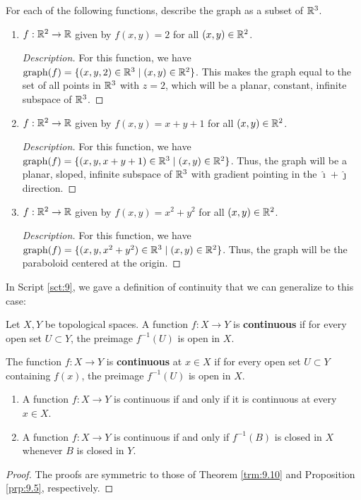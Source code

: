\documentclass[../main.tex]{subfiles}
\begin{document}
\begin{exercise}\label{exr:18.25}
    For each of the following functions, describe the graph as a subset of $\mathbb{R}^3$.
    \begin{enumerate}[label={(\alph*)}]
        \item $f:\mathbb{R}^2\to\mathbb{R}$ given by $f(x,y)=2$ for all $(x,y)\in\mathbb{R}^2$.
        \begin{proof}[Description]
            For this function, we have $\operatorname{graph}(f)=\{(x,y,2)\in\mathbb{R}^3\mid(x,y)\in\mathbb{R}^2\}$. This makes the graph equal to the set of all points in $\mathbb{R}^3$ with $z=2$, which will be a planar, constant, infinite subspace of $\mathbb{R}^3$.
        \end{proof}
        \item $f:\mathbb{R}^2\to\mathbb{R}$ given by $f(x,y)=x+y+1$ for all $(x,y)\in\mathbb{R}^2$.
        \begin{proof}[Description]
            For this function, we have $\operatorname{graph}(f)=\{(x,y,x+y+1)\in\mathbb{R}^3\mid(x,y)\in\mathbb{R}^2\}$. Thus, the graph will be a planar, sloped, infinite subspace of $\mathbb{R}^3$ with gradient pointing in the $\mathbf{\hat{\imath}}+\mathbf{\hat{\jmath}}$ direction.
        \end{proof}
        \item $f:\mathbb{R}^2\to\mathbb{R}$ given by $f(x,y)=x^2+y^2$ for all $(x,y)\in\mathbb{R}^2$.
        \begin{proof}[Description]
            For this function, we have $\operatorname{graph}(f)=\{(x,y,x^2+y^2)\in\mathbb{R}^3\mid(x,y)\in\mathbb{R}^2\}$. Thus, the graph will be the paraboloid centered at the origin.
        \end{proof}
    \end{enumerate}
\end{exercise}

In Script \ref{sct:9}, we gave a definition of continuity that we can generalize to this case:

\begin{definition}\label{dfn:18.26}
    Let $X,Y$ be topological spaces. A function $f:X\to Y$ is \textbf{continuous} if for every open set $U\subset Y$, the preimage $f^{-1}(U)$ is open in $X$.\par
    The function $f:X\to Y$ is \textbf{continuous} at $x\in X$ if for every open set $U\subset Y$ containing $f(x)$, the preimage $f^{-1}(U)$ is open in $X$.
\end{definition}

\begin{theorem}\label{trm:18.27}\leavevmode
    \begin{enumerate}[label={\textup{(}\alph*\textup{)}}]
        \item A function $f:X\to Y$ is continuous if and only if it is continuous at every $x\in X$.
        \item A function $f:X\to Y$ is continuous if and only if $f^{-1}(B)$ is closed in $X$ whenever $B$ is closed in $Y$.
    \end{enumerate}
    \begin{proof}
        The proofs are symmetric to those of Theorem \ref{trm:9.10} and Proposition \ref{prp:9.5}, respectively.
    \end{proof}
\end{theorem}
\end{document}
